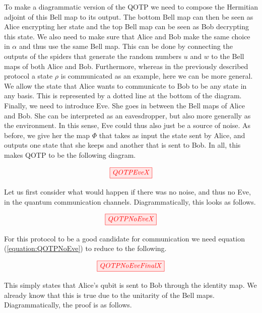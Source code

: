 \documentclass[]{article}
\begin{document}
To make a diagrammatic version of the QOTP we need to compose the Hermitian adjoint of this Bell map to its output. The bottom Bell map can then be seen as Alice encrypting her state and the top Bell map can be seen as Bob decrypting this state. We also need to make sure that Alice and Bob make the same choice in $\alpha$ and thus use the same Bell map. This can be done by connecting the outputs of the spiders that generate the random numbers $u$ and $w$ to the Bell maps of both Alice and Bob. Furthermore, whereas in the previously described protocol a state $\rho$ is communicated as an example, here we can be more general. We allow the state that Alice wants to communicate to Bob to be any state in any basis. This is represented by a dotted line at the bottom of the diagram. Finally, we need to introduce Eve. She goes in between the Bell maps of Alice and Bob. She can be interpreted as an eavesdropper, but also more generally as the environment. In this sense, Eve could thus also just be a source of noise. As before, we give her the map $\Phi$ that takes as input the state sent by Alice, and outputs one state that she keeps and another that is sent to Bob. In all, this makes QOTP to be the following diagram.

\begin{equation}
\tikzfig{QOTPEveX}
\label{equation:QOTPEve}
\end{equation}

\newpage 
Let us first consider what would happen if there was no noise, and thus no Eve, in the quantum communication channels. Diagrammatically, this looks as follows.

\begin{equation}
	\tikzfig{QOTPNoEveX}
	\label{equation:QOTPNoEve}
\end{equation}

For this protocol to be a good candidate for communication we need equation (\ref{equation:QOTPNoEve}) to reduce to the following.

\begin{equation}
	\tikzfig{QOTPNoEveFinalX}
\end{equation}

This simply states that Alice's qubit is sent to Bob through the identity map. We already know that this is true due to the unitarity of the Bell maps. Diagrammatically, the proof is as follows.
\end{document}
